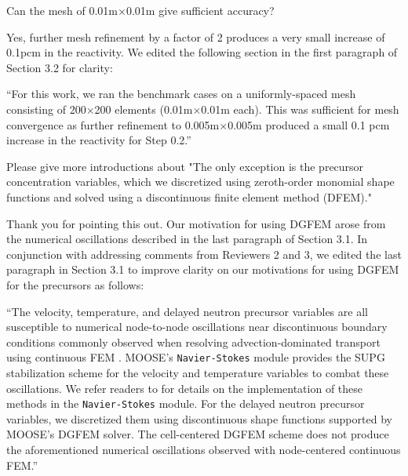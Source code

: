 \documentclass[answers,12pt]{exam}
\begin{document}
\begin{questions}
        \question Can the mesh of 0.01m$\times$0.01m give sufficient accuracy?
        \begin{solution}
        	Yes, further mesh refinement by a factor of 2 produces a very small
        	increase of 0.1pcm in the reactivity. We edited the following
        	section in the first paragraph of Section 3.2 for clarity:
        	
        	``For this work, we ran the benchmark cases on a uniformly-spaced
        	mesh consisting of 200$\times$200 elements (0.01m$\times$0.01m
        	each). This was sufficient for mesh convergence as further
        	refinement to 0.005m$\times$0.005m produced a small 0.1 pcm
        	increase in the reactivity for Step 0.2.''
        \end{solution}

        \question Please give more introductions about "The only exception is
        the precursor concentration variables, which we discretized using
        zeroth-order monomial shape functions and solved using a discontinuous
        finite element method (DFEM)."
        \begin{solution}
        	Thank you for pointing this out. Our motivation for using DGFEM
        	arose from the numerical oscillations described in the last
        	paragraph of Section 3.1. In conjunction with addressing comments
        	from Reviewers 2 and 3, we edited the last paragraph in Section 3.1
        	to improve clarity on our motivations for using DGFEM for the
        	precursors as follows:
        	
        	``The velocity, temperature, and delayed neutron precursor variables are all susceptible to numerical node-to-node oscillations near discontinuous boundary conditions commonly observed when resolving advection-dominated transport using continuous FEM \cite{kuhlmann_lid-driven_2018}. MOOSE's \texttt{Navier-Stokes} module provides the SUPG stabilization scheme \cite{brooks_streamline_1982} for the velocity and temperature variables to combat these oscillations. We refer readers to \cite{peterson_overview_2018} for details on the implementation of these methods in the \texttt{Navier-Stokes} module. For the delayed neutron precursor variables, we discretized them using discontinuous shape functions supported by MOOSE's DGFEM solver. The cell-centered DGFEM scheme does not produce the aforementioned numerical oscillations observed with node-centered continuous FEM.''        	
        	

\end{solution}
\end{questions}
\end{document}
